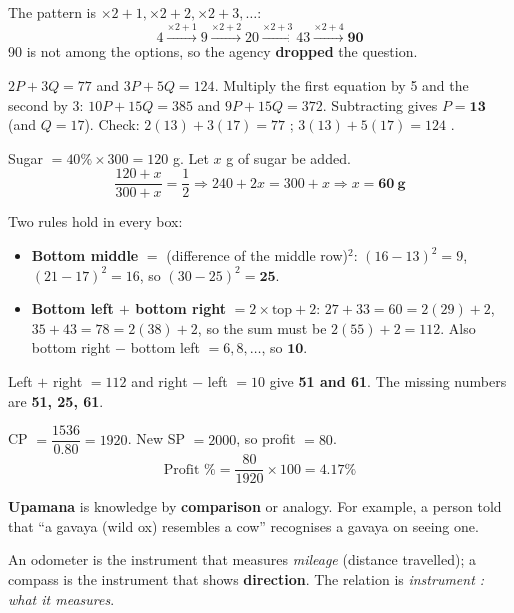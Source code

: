 The pattern is $\times2+1, \times2+2, \times2+3, \ldots$:
\[4\xrightarrow{\times2+1}9\xrightarrow{\times2+2}20\xrightarrow{\times2+3}43\xrightarrow{\times2+4}\mathbf{90}\]
90 is not among the options, so the agency \textbf{dropped} the question.

$2P+3Q=77$ and $3P+5Q=124$.
Multiply the first equation by 5 and the second by 3: $10P+15Q=385$ and $9P+15Q=372$. Subtracting gives $P=\mathbf{13}$ (and $Q=17$).
Check: $2(13)+3(17)=77$ \checkmark; $3(13)+5(17)=124$ \checkmark.

Sugar $=40\%\times300=120$ g. Let $x$ g of sugar be added.
\[\frac{120+x}{300+x}=\frac12\Rightarrow240+2x=300+x\Rightarrow x=\mathbf{60\ g}\]

\qquad{}\qquad{}

Two rules hold in every box:
\begin{itemize}
\item \textbf{Bottom middle} $=$ (difference of the middle row)$^2$: $(16-13)^2=9$, $(21-17)^2=16$, so $(30-25)^2=\mathbf{25}$.
\item \textbf{Bottom left $+$ bottom right} $=2\times\text{top}+2$: $27+33=60=2(29)+2$, $35+43=78=2(38)+2$, so the sum must be $2(55)+2=112$. Also bottom right $-$ bottom left $=6, 8, \ldots$, so $\mathbf{10}$.
\end{itemize}
Left $+$ right $=112$ and right $-$ left $=10$ give \textbf{51 and 61}. The missing numbers are \textbf{51, 25, 61}.

CP $=\dfrac{1536}{0.80}=1920$. New SP $=2000$, so profit $=80$.
\[\text{Profit \%}=\frac{80}{1920}\times100=\mathbf{4.17\%}\]

\textbf{Upamana} is knowledge by \textbf{comparison} or analogy. For example, a person told that ``a gavaya (wild ox) resembles a cow'' recognises a gavaya on seeing one.

An odometer is the instrument that measures \emph{mileage} (distance travelled); a compass is the instrument that shows \textbf{direction}. The relation is \emph{instrument : what it measures}.


